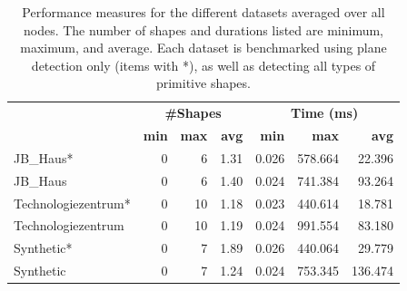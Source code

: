 \begin{table}[h]
    \centering
    \begin{tabular}{ l || r | r | r || r | r | r}
            &\multicolumn{3}{c||}{\textbf{\#Shapes}} & \multicolumn{3}{c}{\textbf{Time (ms)}}\\
            &\textbf{min} & \textbf{max} & \textbf{avg}  & \textbf{min} & \textbf{max} & \textbf{avg}  \\
            \hline
            JB\_Haus*           & 0 & 6  & 1.31 & 0.026 & 578.664 &  22.396 \\
            JB\_Haus            & 0 & 6  & 1.40 & 0.024 & 741.384 &  93.264 \\
            Technologiezentrum* & 0 & 10 & 1.18 & 0.023 & 440.614 &  18.781 \\
            Technologiezentrum  & 0 & 10 & 1.19 & 0.024 & 991.554 &  83.180 \\
            Synthetic*          & 0 & 7  & 1.89 & 0.026 & 440.064 &  29.779 \\
            Synthetic           & 0 & 7  & 1.24 & 0.024 & 753.345 & 136.474 \\
        \end{tabular}
    \caption[Shape-detection performance measure for different datasets]
        {Performance measures for the different datasets averaged over all nodes. The number of shapes and durations listed are minimum, maximum, and average. Each dataset is benchmarked using plane detection only (items with *), as well as detecting all types of primitive shapes. }
    \label{table:schnabel_benchmarks}
\end{table}


